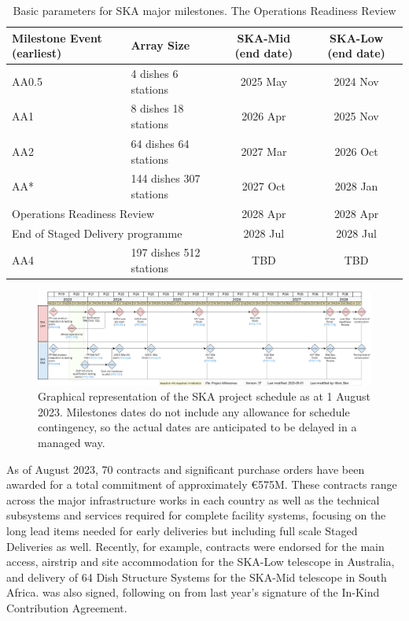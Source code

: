 \documentclass[a4paper,
               biblatex,     %
               keeplastbox,   %
               ]{jacow}
\begin{document}
\begin{table}[!h]
	\centering
	\caption{Basic parameters for SKA major milestones. The Operations Readiness Review }
        \begin{tabular}{llcc}
            \toprule
            Milestone Event (earliest) & Array Size & SKA-Mid (end date) & SKA-Low (end date)\\
            \midrule
            AA0.5 & 4 dishes 6 stations   & 2025 May & 2024 Nov\\
            AA1   & 8 dishes 18 stations  & 2026 Apr & 2025 Nov\\
            AA2   & 64 dishes 64 stations & 2027 Mar & 2026 Oct\\
            AA* & 144 dishes 307 stations & 2027 Oct & 2028 Jan\\
            \multicolumn{2}{l}{Operations Readiness Review} & 2028 Apr & 2028 Apr\\
            \multicolumn{2}{l}{End of Staged Delivery programme} & 2028 Jul & 2028 Jul\\
            AA4 & 197 dishes 512 stations & TBD & TBD\\
            \bottomrule
        \end{tabular}
	\label{tab:array-assemblies}
 \end{table}

 \begin{figure}[tb]
	\centering
	  \includegraphics[width=\textwidth]{FR1BCO03f2.png}
	\caption{
		Graphical representation of the SKA project schedule as at 1 August 2023. Milestones dates do not include any allowance for schedule contingency, so the actual dates are anticipated to be delayed in a managed way.
	}
	\label{fig:ska-timeline}
  \end{figure}

As of August 2023, 70 contracts and significant purchase orders have been awarded for a total commitment of approximately €575M. These contracts range across the major infrastructure works in each country as well as the technical subsystems and services required for complete facility systems, focusing on the long lead items needed for early deliveries but including full scale Staged Deliveries as well. Recently, for example, contracts were endorsed for the main access, airstrip and site accommodation for the SKA-Low telescope in Australia, and delivery of 64 Dish Structure Systems for the SKA-Mid telescope in South Africa. was also signed, following on from last year’s signature of the In-Kind Contribution Agreement.
\end{document}
